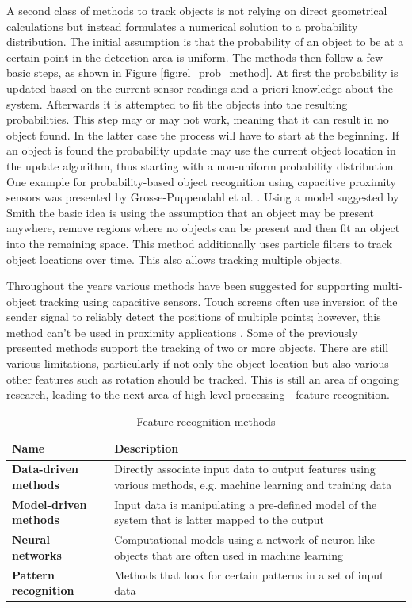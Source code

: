 A second class of methods to track objects is not relying on direct geometrical calculations but instead formulates a numerical solution to a probability distribution. The initial assumption is that the probability of an object to be at a certain point in the detection area is uniform. The methods then follow a few basic steps, as shown in Figure \ref{fig:rel_prob_method}. At first the probability is updated based on the current sensor readings and a priori knowledge about the system. Afterwards it is attempted to fit the objects into the resulting probabilities. This step may or may not work, meaning that it can result in no object found. In the latter case the process will have to start at the beginning. If an object is found the probability update may use the current object location in the update algorithm, thus starting with a non-uniform probability distribution.
One example for probability-based object recognition using capacitive proximity sensors was presented by Grosse-Puppendahl et al. \cite{grosse2013swiss}. Using a model suggested by Smith the basic idea is using the assumption that an object may be present anywhere, remove regions where no objects can be present and then fit an object into the remaining space. This method additionally uses particle filters to track object locations over time. This also allows tracking multiple objects. 

Throughout the years various methods have been suggested for supporting multi-object tracking using capacitive sensors. Touch screens often use inversion of the sender signal to reliably detect the positions of multiple points; however, this method can't be used in proximity applications \cite{wilson2007}. Some of the previously presented methods support the tracking of two or more objects. There are still various limitations, particularly if not only the object location but also various other features such as rotation should be tracked. This is still an area of ongoing research, leading to the next area of high-level processing - feature recognition.
\begin{table}[htbp]
  \centering
  \caption{Feature recognition methods}
    \begin{tabular}{lp{7cm}}
    \toprule
    \textbf{Name} & \textbf{Description} \\
    \midrule
    \textbf{Data-driven  methods} & Directly associate input data to output features using various methods, e.g. machine learning and training data \\ \addlinespace
    \textbf{Model-driven methods} & Input data is manipulating a pre-defined model of the system that is latter mapped to the output \\ \addlinespace
    \textbf{Neural networks} & Computational models using a network of neuron-like objects that are often used in machine learning \\ \addlinespace
    \textbf{Pattern recognition} & Methods that look for certain patterns in a set of input data \\
    \bottomrule
    \end{tabular}%
  \label{tab:rel_feature}%
\end{table}%

